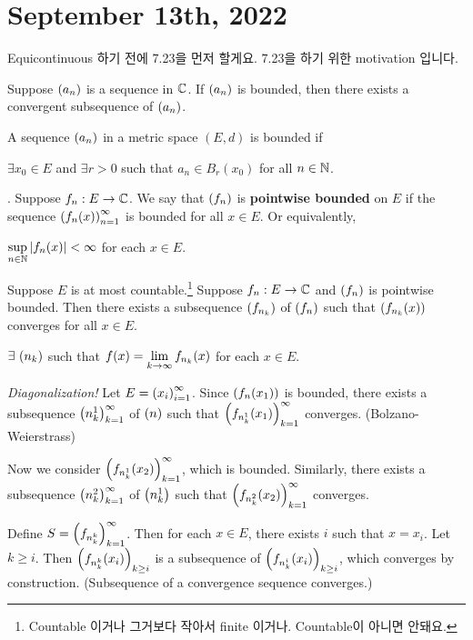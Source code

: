 \section*{September 13th, 2022}

Equicontinuous 하기 전에 7.23을 먼저 할게요. 7.23을 하기 위한 motivation 입니다.

\recall {} Suppose \(\left( a_n \right)\) is a sequence in \(\mathbb{C}\). If \(\left( a_n \right)\) is bounded, then there exists a convergent subsequence of \(\left( a_n \right)\).

\recall A sequence \(\left( a_n \right)\) in a metric space \((E, d)\) is bounded if
\begin{center}
    \(\exists x_0 \in E\) and \(\exists r > 0\) such that \(a_n \in B_r(x_0)\) for all \(n \in \mathbb{N}\).
\end{center}

. Suppose \(f_n: E \rightarrow \mathbb{C}\). We say that \(\left( f_n \right)\) is \textbf{pointwise bounded} on \(E\) if the sequence \(\left( f_n(x) \right)_{n=1}^\infty\) is bounded for all \(x \in E\). Or equivalently,
\begin{center}
    \(\displaystyle \sup_{n \in \mathbb{N}} \left| f_n(x) \right| < \infty\) for each \(x \in E\).
\end{center}

 Suppose \(E\) is at most countable.\footnote{Countable 이거나 그거보다 작아서 finite 이거나. Countable이 아니면 안돼요.} Suppose \(f_n: E \rightarrow \mathbb{C}\) and \(\left( f_n \right)\) is pointwise bounded. Then there exists a subsequence \(\left( f_{n_k} \right)\) of \(\left( f_n \right)\) such that \(\left( f_{n_k}(x) \right)\) converges for all \(x \in E\).
\begin{center}
    \(\exists \seq{n_k}\) such that \(f(x) = \displaystyle \lim_{k \rightarrow\infty} f_{n_k}(x)\) for each \(x \in E\). %
\end{center}

\pf \textit{Diagonalization!} Let \(E = \left( x_i \right)_{i=1}^\infty\). Since \(\left( f_n(x_1) \right)\) is bounded, there exists a subsequence \(\left( n_k^1 \right)_{k=1}^\infty\) of \(\left( n \right)\) such that \(\left( f_{n_k^1}(x_1) \right)_{k=1}^\infty\) converges. (Bolzano-Weierstrass)

Now we consider \(\left( f_{n_k^1}(x_2) \right)_{k=1}^\infty\), which is bounded. Similarly, there exists a subsequence \(\left( n_k^2 \right)_{k=1}^\infty\) of \(\left( n_k^1 \right)\) such that \(\left( f_{n_k^2}(x_2) \right)_{k=1}^\infty\) converges.


Define \(S = \left( f_{n_k^k} \right)_{k=1}^\infty\). Then for each \(x \in E\), there exists \(i\) such that \(x = x_i\). Let \(k \geq i\). Then \(\left( f_{n_k^k}(x_i) \right)_{k \geq i}\) is a subsequence of \(\left( f_{n_k^i}(x_i) \right)_{k \geq i}\), which converges by construction. (Subsequence of a convergence sequence converges.)

